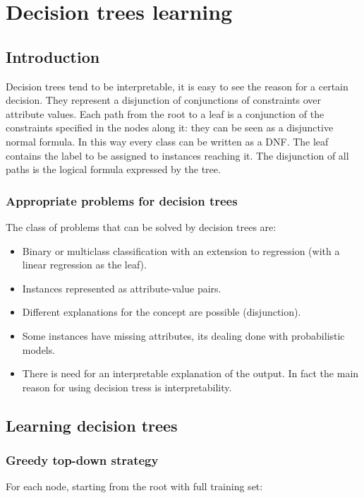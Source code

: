 \chapter{Decision trees learning}

\section{Introduction}
Decision trees tend to be interpretable, it is easy to see the reason for a certain decision.
They represent a disjunction of conjunctions of constraints over attribute values.
Each path from the root to a leaf is a conjunction of the constraints specified in the nodes along it: they can be seen as a disjunctive normal formula.
In this way every class can be written as a DNF.
The leaf contains the label to be assigned to instances reaching it.
The disjunction of all paths is the logical formula expressed by the tree.

	\subsection{Appropriate problems for decision trees}
	The class of problems that can be solved by decision trees are:

	\begin{multicols}{2}
		\begin{itemize}
			\item Binary or multiclass classification with an extension to regression (with a linear regression as the leaf).
			\item Instances represented as attribute-value pairs.
			\item Different explanations for the concept are possible (disjunction).
			\item Some instances have missing attributes, its dealing done with probabilistic models.
			\item There is need for an interpretable explanation of the output.
				In fact the main reason for using decision tress is interpretability.
		\end{itemize}
	\end{multicols}

\section{Learning decision trees}

	\subsection{Greedy top-down strategy}
	For each node, starting from the root with full training set:

